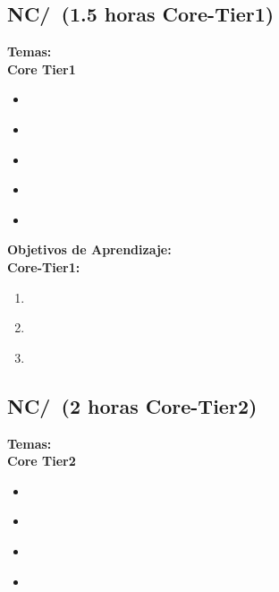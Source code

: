 \subsection{NC/\NCNetworkedApplications~(1.5 horas Core-Tier1)}\label{sec:BOK:NCNetworkedApplications}
\noindent \textbf{Temas:}\\
\noindent \textbf{Core Tier1}
\begin{itemize}
	\item \NCNetworkedApplicationsTopicNaming\label{sec:BOK:NCNetworkedApplicationsTopicNaming}
	\item \NCNetworkedApplicationsTopicDistributed\label{sec:BOK:NCNetworkedApplicationsTopicDistributed}
	\item \NCNetworkedApplicationsTopicHttp\label{sec:BOK:NCNetworkedApplicationsTopicHttp}
	\item \NCNetworkedApplicationsTopicMultiplexing\label{sec:BOK:NCNetworkedApplicationsTopicMultiplexing}
	\item \NCNetworkedApplicationsTopicSocket\label{sec:BOK:NCNetworkedApplicationsTopicSocket}
\end{itemize}


\noindent \textbf{Objetivos de Aprendizaje:}\\
\noindent \textbf{Core-Tier1:}
\begin{enumerate}
	\setcounter{enumi}{0}
	\item \NCNetworkedApplicationsLOListTheThe\xspace[\NCNetworkedApplicationsLOListTheTheLevel]\label{sec:BOK:NCNetworkedApplicationsLOListTheThe}
	\item \NCNetworkedApplicationsLODefineTheNaming\xspace[\NCNetworkedApplicationsLODefineTheNamingLevel]\label{sec:BOK:NCNetworkedApplicationsLODefineTheNaming}
	\item \NCNetworkedApplicationsLOImplementAServer\xspace[\NCNetworkedApplicationsLOImplementAServerLevel]\label{sec:BOK:NCNetworkedApplicationsLOImplementAServer}
\end{enumerate}


\subsection{NC/\NCReliableDataDelivery~(2 horas Core-Tier2)}\label{sec:BOK:NCReliableDataDelivery}
\noindent \textbf{Temas:}\\
\noindent \textbf{Core Tier2}
\begin{itemize}
	\item \NCReliableDataDeliveryTopicError\label{sec:BOK:NCReliableDataDeliveryTopicError}
	\item \NCReliableDataDeliveryTopicFlow\label{sec:BOK:NCReliableDataDeliveryTopicFlow}
	\item \NCReliableDataDeliveryTopicPerformance\label{sec:BOK:NCReliableDataDeliveryTopicPerformance}
	\item \NCReliableDataDeliveryTopicTcp\label{sec:BOK:NCReliableDataDeliveryTopicTcp}
\end{itemize}


